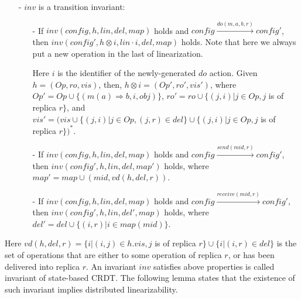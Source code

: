 {\begin{itemize}
\item[-] $\mathit{inv}$ is a transition invariant:

    \begin{itemize}
    \setlength{\itemsep}{0.5pt}
    \item[-] If $\mathit{inv}(\mathit{config},h,\mathit{lin},\mathit{del},\mathit{map})$ holds and $\mathit{config} {\xrightarrow{\mathit{do}(m,a,b,r)}} \mathit{config}'$, then $\mathit{inv}(\mathit{config}', h \otimes i, \mathit{lin} \cdot i,\mathit{del},\mathit{map})$ holds. Note that here we always put a new operation in the last of linearization.

        Here $i$ is the identifier of the newly-generated $\mathit{do}$ action. Given $h = (\mathit{Op},\mathit{ro},\mathit{vis})$, then, $h \otimes i = (\mathit{Op}',\mathit{ro}',\mathit{vis}')$, where $\mathit{Op}' = \mathit{Op} \cup \{ (m(a) \Rightarrow b,i,\mathit{obj}) \}$, $\mathit{ro}' = \mathit{ro} \cup \{ (j,i) \vert j \in \mathit{Op}, j$ is of replica $r \}$, and $\mathit{vis}' = (\mathit{vis} \cup \{ (j,i) \vert j \in \mathit{Op},(j,r) \in \mathit{del} \} \cup \{ (j,i) \vert j \in \mathit{Op}, j$ is of replica $r \})^*$.

    \item[-] If $\mathit{inv}(\mathit{config},h,\mathit{lin},\mathit{del},\mathit{map})$ holds and $\mathit{config} {\xrightarrow{\mathit{send}(\mathit{mid},r)}} \mathit{config}'$, then $\mathit{inv}(\mathit{config}',h,\mathit{lin},\mathit{del},\mathit{map}')$ holds, where $\mathit{map}' = \mathit{map} \cup (\mathit{mid}, \mathit{vd}(h,\mathit{del},r))$.


    \item[-] If $\mathit{inv}(\mathit{config},h,\mathit{lin},\mathit{del},\mathit{map})$ holds and $\mathit{config} {\xrightarrow{\mathit{receive}(\mathit{mid},r)}} \mathit{config}'$, then $\mathit{inv}(\mathit{config}',h,\mathit{lin},\mathit{del}',\mathit{map})$ holds, where $\mathit{del}' = \mathit{del} \cup \{ (i,r) \vert i \in \mathit{map}(\mathit{mid}) \}$.
    \end{itemize}
\end{itemize}

Here $\mathit{vd}(h,\mathit{del},r) = \{ i \vert (i,j) \in h.\mathit{vis}, j$ is of replica $r \} \cup \{ i \vert (i,r) \in \mathit{del} \}$ is the set of operations that are either to some operation of replica $r$, or has been delivered into replica $r$. An invariant $\mathit{inv}$ satisfies above properties is called invariant of state-based CRDT. The following lemma states that the existence of such invariant implies distributed linearizability.

}
